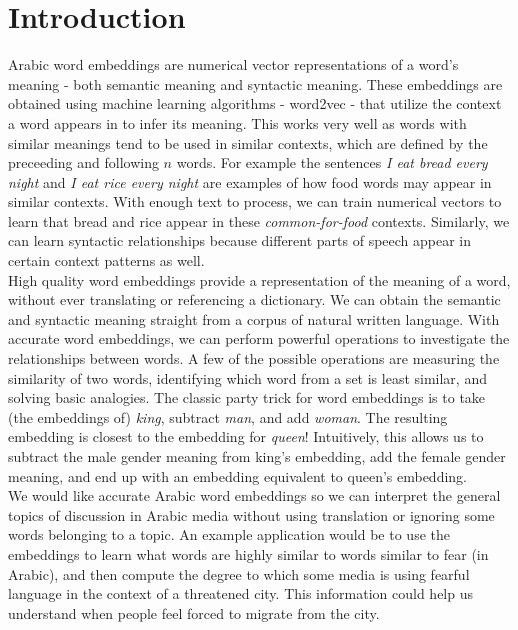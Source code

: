 \section{Introduction}

Arabic word embeddings are numerical vector representations of a word’s meaning - both semantic meaning and syntactic meaning. These embeddings are obtained using machine learning algorithms - word2vec - that utilize the context a word appears in to infer its meaning.
This works very well as words with similar meanings tend to be used in similar contexts, which are defined by the preceeding and following $n$ words. For example the sentences \textit{I eat bread every night} and \textit{I eat rice every night} are examples of how food words may appear in similar contexts. With enough text to process, we can train numerical vectors to learn that bread and rice appear in these \textit{common-for-food} contexts.
Similarly, we can learn syntactic relationships because different parts of speech appear in certain context patterns as well.
\\
High quality word embeddings provide a representation of the meaning of a word, without ever translating or referencing a dictionary. We can obtain the semantic and syntactic meaning straight from a corpus of natural written language. With accurate word embeddings, we can perform powerful operations to investigate the relationships between words. A few of the possible operations are measuring the similarity of two words, identifying which word from a set is least similar, and solving basic analogies. The classic party trick for word embeddings is to take (the embeddings of) \textit{king}, subtract \textit{man}, and add \textit{woman}. The resulting embedding is closest to the embedding for \textit{queen}! Intuitively, this allows us to subtract the male gender meaning from king’s embedding, add the female gender meaning, and end up with an embedding equivalent to queen’s embedding.
\\
We would like accurate Arabic word embeddings so we can interpret the general topics of discussion in Arabic media without using translation or ignoring some words belonging to a topic. An example application would be to use the embeddings to learn what words are highly similar to words similar to fear (in Arabic), and then compute the degree to which some media is using fearful language in the context of a threatened city. This information could help us understand when people feel forced to migrate from the city.